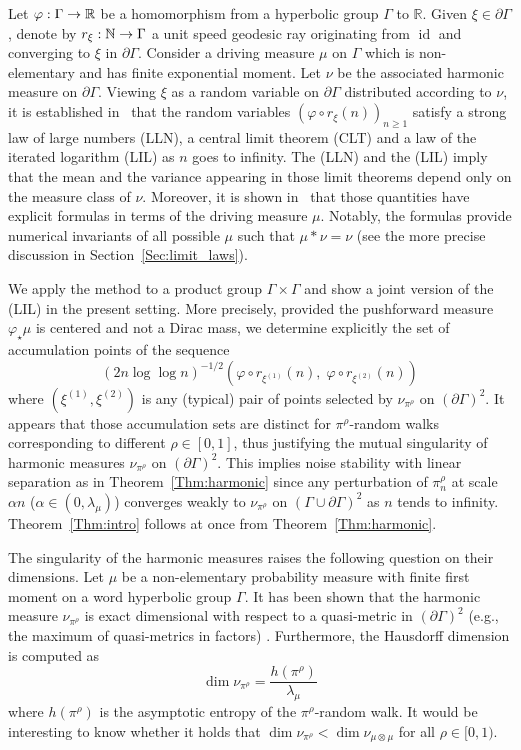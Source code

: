 \documentclass[AHL,Unicode,longabstracts,published]{cedram}
\DeclareMathOperator{\id}{id}
\newcommand{\f}{\varphi}
\newcommand{\N}{\mathbb{N}}
\newcommand{\R}{\mathbb{R}}
\renewcommand{\(}{\left(}
\renewcommand{\)}{\right)}
\renewcommand*{\to}{\mathchoice{\longrightarrow}{\rightarrow}{\rightarrow}{\rightarrow}}
\begin{document}
Let $\f:\Gamma \to \R$ be a homomorphism from a hyperbolic group $\Gamma$ to $\R$. Given $\xi\in \partial \Gamma$, denote by $r_\xi: \N \to \Gamma$ a unit speed geodesic ray originating from $\id$ and converging to $\xi$ in $\partial \Gamma$. Consider a driving measure $\mu$ on $\Gamma$ which is non-elementary and has finite exponential moment. Let $\nu$ be the associated harmonic measure on $\partial \Gamma$. Viewing $\xi$ as a random variable on $\partial \Gamma$ distributed according to $\nu$, it is established in~\cite[Theorem~1.4]{BenardWinding} that the random variables $(\f\circ r_\xi(n))_{n\geq 1}$ satisfy a strong law of large numbers (LLN), a central limit theorem (CLT) and a law of the iterated logarithm (LIL) as $n$ goes to infinity. The (LLN) and the (LIL) imply that the mean and the variance appearing in those limit theorems depend only on the measure class of $\nu$. Moreover, it is shown in~\cite{BenardWinding} that those quantities have explicit formulas in terms of the driving measure $\mu$. Notably, the formulas provide numerical invariants of all possible $\mu$ such that $\mu\ast \nu=\nu$ (see the more precise discussion in Section~\ref{Sec:limit_laws}).


We apply the method to a product group $\Gamma \times \Gamma$ and show a joint version of the (LIL) in the present setting. More precisely, provided the pushforward measure $\varphi_{\star}\mu$ is centered and not a Dirac mass, we determine explicitly the set of accumulation points of the sequence
\[
(2n \log \log n)^{-1/2}\left(\f \circ r_{\xi^{(1)}}(n),\; \f \circ r_{\xi^{(2)}}(n)\right)
\]
where $(\xi^{(1)}, \xi^{(2)})$ is any (typical) pair of points selected by $\nu_{\pi^\rho}$ on $(\partial \Gamma)^2$. It appears that those accumulation sets are distinct for $\pi^\rho$-random walks corresponding to different $\rho \in [0, 1]$, thus justifying the mutual singularity of harmonic measures $\nu_{\pi^\rho}$ on $(\partial \Gamma)^2$. This implies noise stability with linear separation as in Theorem~\ref{Thm:harmonic} since any perturbation of $\pi^\rho_n$ at scale $\alpha n$ ($\alpha\in (0, \lambda_{\mu})$) converges weakly to $\nu_{\pi^\rho}$ on $(\Gamma \cup \partial \Gamma)^2$ as $n$ tends to infinity. Theorem~\ref{Thm:intro} follows at once from Theorem~\ref{Thm:harmonic}.


The singularity of the harmonic measures raises the following question on their dimensions. Let $\mu$ be a non-elementary probability measure with finite first moment on a word hyperbolic group $\Gamma$. It has been shown that the harmonic measure $\nu_{\pi^\rho}$ is exact dimensional with respect to a quasi-metric in $(\partial \Gamma)^2$ (e.g., the maximum of quasi-metrics in factors) \cite[Theorem~3.1]{NonNS}. Furthermore, the Hausdorff dimension is computed as
\[
\dim \nu_{\pi^\rho}=\frac{h(\pi^\rho)}{\lambda_\mu}
\]
where $h(\pi^\rho)$ is the asymptotic entropy of the $\pi^\rho$-random walk. It would be interesting to know whether it holds that $\dim \nu_{\pi^\rho}<\dim \nu_{\mu\otimes \mu}$ for all $\rho \in [0, 1)$.
\end{document}
